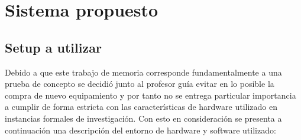 \documentclass[\main/main.tex]{subfiles}
\begin{document}
\chapter{Sistema propuesto}
\label{cha:03_sistema_propuesto}

\section{Setup a utilizar}
\label{sec:03_setup}
	Debido a que este trabajo de memoria corresponde fundamentalmente a una prueba de concepto se decidió junto al profesor guía evitar en lo posible la compra de nuevo equipamiento y por tanto no se entrega particular importancia a cumplir de forma estricta con las características de hardware utilizado en instancias formales de investigación. Con esto en consideración se presenta a continuación una descripción del entorno de hardware y software utilizado:
	\begin{table}[H]\begin{center}\footnotesize{
		\caption{Hardware y software utilizado en el desarrollo.}
		\label{tbl:03_hs_selection}
	}\end{center}\end{table}
\end{document}
